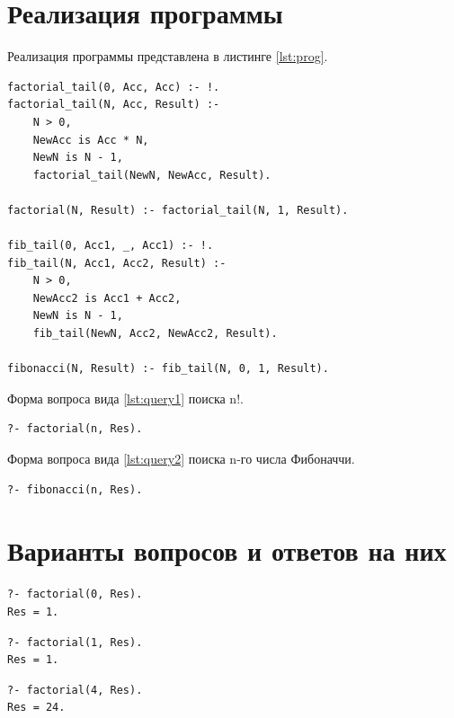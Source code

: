 \section{Реализация программы}

Реализация программы представлена в листинге \ref{lst:prog}.

\begin{lstlisting}[caption={Реализация программы}, label={lst:prog}]
factorial_tail(0, Acc, Acc) :- !.
factorial_tail(N, Acc, Result) :-
    N > 0,
    NewAcc is Acc * N,
    NewN is N - 1,
    factorial_tail(NewN, NewAcc, Result).

factorial(N, Result) :- factorial_tail(N, 1, Result).

fib_tail(0, Acc1, _, Acc1) :- !.
fib_tail(N, Acc1, Acc2, Result) :-
    N > 0,
    NewAcc2 is Acc1 + Acc2,
    NewN is N - 1,
    fib_tail(NewN, Acc2, NewAcc2, Result).

fibonacci(N, Result) :- fib_tail(N, 0, 1, Result).
\end{lstlisting}

Форма вопроса вида \ref{lst:query1} поиска n!.
\begin{lstlisting}[caption={Форма задания вопроса 1}, label={lst:query1}]
?- factorial(n, Res).
\end{lstlisting}

Форма вопроса вида \ref{lst:query2} поиска n-го числа Фибоначчи.
\begin{lstlisting}[caption={Форма задания вопроса 2}, label={lst:query2}]
?- fibonacci(n, Res).
\end{lstlisting}

\clearpage
\section{Варианты вопросов и ответов на них}

\begin{lstlisting}[caption={Вопрос и ответ №1}, label={lst:q1}]
?- factorial(0, Res).
Res = 1.
\end{lstlisting}

\begin{lstlisting}[caption={Вопрос и ответ №2}, label={lst:q2}]
?- factorial(1, Res).
Res = 1.
\end{lstlisting}

\begin{lstlisting}[caption={Вопрос и ответ №3}, label={lst:q3}]
?- factorial(4, Res).
Res = 24.
\end{lstlisting}


